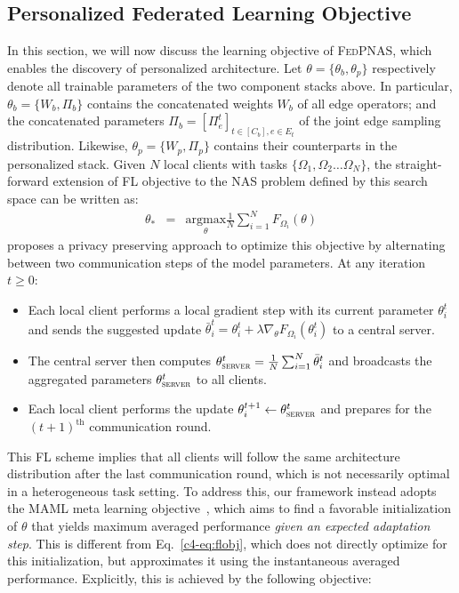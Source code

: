 \subsection{Personalized Federated Learning Objective}
\label{c4-subsec:objective}
In this section, we will now discuss the learning objective of \textsc{FedPNAS}, which enables the discovery of personalized architecture. Let $\theta = \{\theta_b, \theta_p\}$ respectively denote all trainable parameters of the two component stacks above. In particular, $\theta_b=\{W_b, \Pi_b\}$ contains the concatenated weights $W_b$ of all edge operators; and the concatenated parameters $\Pi_b = [\Pi^t_e]_{t\in [C_b], e\in E_t}$ of the joint edge sampling distribution. Likewise, $\theta_p=\{W_p, \Pi_p\}$ contains their counterparts in the personalized stack. Given $N$ local clients with tasks $\{\Omega_1, \Omega_2 \dots \Omega_N\}$, the straight-forward extension of FL objective to the NAS problem defined by this search space can be written as:
\begin{eqnarray}
\theta_{\ast} &=& \underset{\theta}{\mathrm{argmax}} \frac{1}{N} \sum_{i=1}^N F_{\Omega_i}(\theta)
\label{c4-eq:flobj}
\end{eqnarray}
\citet{McMahan17} proposes a privacy preserving approach to optimize this objective by alternating between two communication steps of the model parameters. At any iteration $t \geq 0$:
\begin{itemize}
    \item Each local client performs a local gradient step with its current parameter $\theta^{t}_i$ and sends the suggested update $\bar{\theta}^t_i = \theta^t_i + \lambda\nabla_{\theta} F_{\Omega_i}(\theta^t_i)$ to a central server.
    \item The central server then computes $\theta^{t}_{\textsc{server}} = \frac{1}{N}\sum_{i=1}^N \bar{\theta}^t_i$ and broadcasts the aggregated parameters $\theta^{t}_{\textsc{server}}$ to all clients.
    \item Each local client performs the update $\theta^{t+1}_i \leftarrow \theta^{t}_{\textsc{server}}$ and prepares for the $(t+1)^{\text{th}}$ communication round.
\end{itemize}
This FL scheme implies that all clients will follow the same architecture distribution after the last communication round, which is not necessarily optimal in a heterogeneous task setting. To address this, our framework instead adopts the MAML meta learning objective~\citep{Finn17}, which aims to find a favorable initialization of $\theta$ that yields maximum averaged performance \textit{given an expected adaptation step}. This is different from Eq.~\ref{c4-eq:flobj}, which does not directly optimize for this initialization, but approximates it using the instantaneous averaged performance. Explicitly, this is achieved by the following objective:
